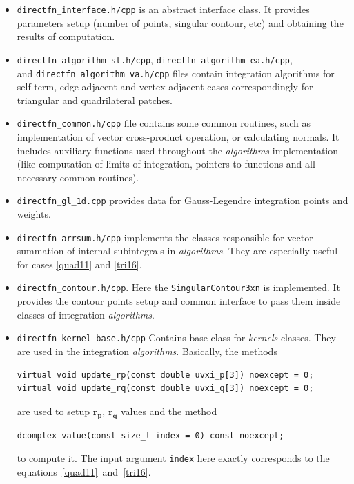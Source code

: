 \documentclass[a4wide,11pt]{article}
\renewcommand{\[}{\begin{equation}}
\renewcommand{\]}{\end{equation}}
\renewcommand{\{}{\begin{eqnarray}}
\renewcommand{\}}{\end{eqnarray}}
\begin{document}
\begin{itemize}
\item \texttt{directfn\_interface.h/cpp}
is an abstract interface class. It provides  parameters setup  (number of points, singular
contour, etc) and obtaining the results of computation.

\item \texttt{directfn\_algorithm\_st.h/cpp}, \texttt{directfn\_algorithm\_ea.h/cpp},\\ 
and \texttt{directfn\_algorithm\_va.h/cpp} files contain integration algorithms  for self-term, edge-adjacent and vertex-adjacent cases
correspondingly for triangular and quadrilateral patches.

\item \texttt{directfn\_common.h/cpp} file contains some common routines, such as implementation of vector cross-product operation, or calculating normals. It includes auxiliary functions used throughout the \emph{algorithms}  implementation
(like computation of limits of integration, pointers to functions and all necessary common routines). 

\item \texttt{directfn\_gl\_1d.cpp} provides data for Gauss-Legendre integration points and weights.

\item \texttt{directfn\_arrsum.h/cpp} implements the classes responsible for vector summation of
internal subintegrals in \emph{algorithms}. They are especially useful for cases \eqref{quad11} and \eqref{tri16}.

\item \texttt{directfn\_contour.h/cpp}. Here the \texttt{SingularContour3xn} is implemented. It
provides the contour points setup and common interface to pass them inside classes of 
integration \emph{algorithms}.

\item \texttt{directfn\_kernel\_base.h/cpp} Contains base class for \emph{kernels} classes.
They are used in the integration \emph{algorithms}. Basically,
the methods
\begin{verbatim}
virtual void update_rp(const double uvxi_p[3]) noexcept = 0;
virtual void update_rq(const double uvxi_q[3]) noexcept = 0;
\end{verbatim}
are used to setup $\mathbf{r_p}$, $\mathbf{r_q}$ values and
 the method 
\begin{verbatim}
dcomplex value(const size_t index = 0) const noexcept;
\end{verbatim}
to compute it. The input argument \texttt{index} here exactly corresponds to the 
equations~\eqref{quad11}~and~\eqref{tri16}.
	

\end{itemize}
\end{document}
